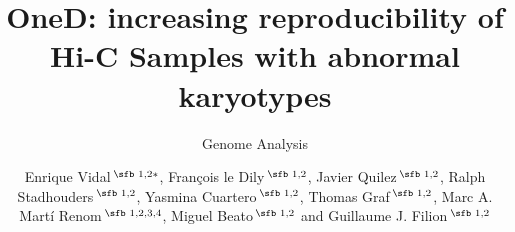 \documentclass{bioinfo}
\begin{document}

\subtitle{Genome Analysis}

\title[OneD]{OneD: increasing reproducibility of Hi-C Samples with
abnormal karyotypes}

\author[Vidal \textit{et~al}.]{Enrique Vidal\,$^{\text{\sfb 1,2}*}$,
François le Dily\,$^{\text{\sfb 1,2}}$, Javier Quilez\,$^{\text{\sfb
1,2}}$, Ralph Stadhouders\,$^{\text{\sfb 1,2}}$, Yasmina
Cuartero\,$^{\text{\sfb 1,2}}$, Thomas Graf\,$^{\text{\sfb 1,2}}$, Marc A.
Mart\'i Renom\,$^{\text{\sfb 1,2,3,4}}$, Miguel Beato\,$^{\text{\sfb 1,2}}$
and Guillaume J. Filion\,$^{\text{\sfb 1,2}}$}

\address{$^{\text{\sf 1}}$Gene Regulation, Stem Cells and Cancer Program,
Centre for Genomic Regulation (CRG), The Barcelona Institute of Science
and Technology (BIST), Dr. Aiguader 88, 08003, Barcelona, Spain \\
$^{\text{\sf 2}}$Universitat Pompeu Fabra (UPF), Barcelona, Spain \\
$^{\text{\sf 3}}$CNAG-CRG, Centre for Genomic Regulation (CRG), Barcelona
Institute of Science and Technology (BIST), Baldiri i Reixac 4, 08028 Barcelona,
Spain \\
$^{\text{\sf 4}}$ICREA, Pg. Lluís Companys 23, 08010 Barcelona, Spain}




\end{document}
